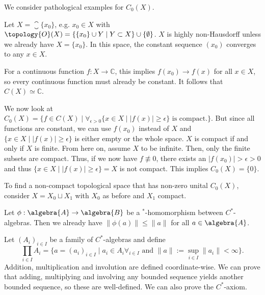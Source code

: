 \documentclass[a4paper]{article}
\begin{document}

\begin{exercise}[1.2]
	We consider pathological examples for $C_0(X)$.

	Let $X = \closure{\{x_0\}}$, e.g. $x_0 \in X$ with $\topology{O}(X) = \{\{x_0\} \cup Y \mid Y \subset X\} \cup \{\emptyset\}$. $X$ is highly non-Hausdorff unless we already have $X = \{x_0\}$.	In this space, the constant sequence $(x_0)$ converges to any $x \in X$.

	For a continuous function $f: X \to \mathds{C}$, this implies $f(x_0) \to f(x)$ for all $x \in X$, so every continuous function must already be constant. It follows that $C(X) \simeq \mathds{C}$.

	We now look at $C_0(X) = \{f \in C(X) \mid \forall_{\epsilon > 0} \{x \in X \mid  |f(x)| \geq \epsilon \} \text{ is compact.}\}$. But since all functions are constant, we can use $f(x_0)$ instead of $X$ and $\{x \in X \mid  |f(x)| \geq \epsilon \}$ is either empty or the whole space. $X$ is compact if and only if $X$ is finite. From here on, assume $X$ to be infinite. Then, only the finite subsets are compact. Thus, if we now have $f \not \equiv 0$, there exists an $|f(x_0)| > \epsilon > 0$ and thus $\{x \in X \mid  |f(x)| \geq \epsilon \} = X$ is not compact. This implies $C_0(X) = \{0\}$.

	To find a non-compact topological space that has non-zero unital $C_0(X)$, consider $X = X_0 \sqcup X_1$ with $X_0$ as before and $X_1$ compact.
\end{exercise}

\begin{theorem}
	Let $\phi: \algebra{A} \to \algebra{B}$ be a $^*$-homomorphism between $C^*$-algebras. Then we already have $\|\phi(a)\| \leq \|a\|$ for all $a \in \algebra{A}$.
\end{theorem}

\begin{exercise}[1.4 - Products]
	Let $(A_i)_{i \in I}$ be a family of $C^*$-algebras and define
	\begin{equation*}
		\prod_{i \in I} A_i = \{a = (a_i)_{i \in I} \mid a_i \in A_i \forall_{i \in I} \text{ and } \|a\| := \sup_{i \in I} \|a_i\| < \infty \}\text{.}
	\end{equation*}
	Addition, multiplication and involution are defined coordinate-wise. We can prove that adding, multiplying and involving any bounded sequence yields another bounded sequence, so these are well-defined. We can also prove the $C^*$-axiom.
\end{exercise}
\end{document}
